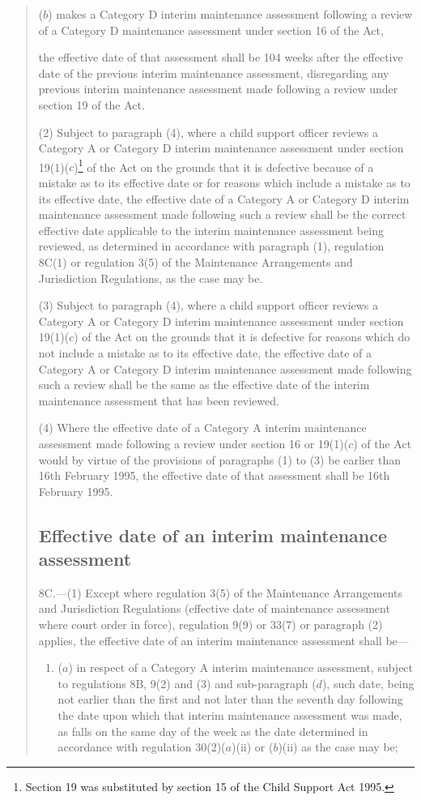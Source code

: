\documentclass[12pt,a4paper]{article}
\begin{document}
\begin{quotation}
\begin{enumerate}
($b$) makes a Category D interim maintenance assessment following a review of a Category D maintenance assessment under section 16 of the Act,
\end{enumerate}
the effective date of that assessment shall be 104 weeks after the effective date of the previous interim maintenance assessment, disregarding any previous interim maintenance assessment made following a review under section 19 of the Act.

(2) Subject to paragraph (4), where a child support officer reviews a Category A or Category D interim maintenance assessment under section 19(1)($c$)\footnote{\frenchspacing Section 19 was substituted by section 15 of the Child Support Act 1995.} of the Act on the grounds that it is defective because of a mistake as to its effective date or for reasons which include a mistake as to its effective date, the effective date of a Category A or Category D interim maintenance assessment made following such a review shall be the correct effective date applicable to the interim maintenance assessment being reviewed, as determined in accordance with paragraph (1), regulation 8C(1) or regulation 3(5) of the Maintenance Arrangements and Jurisdiction Regulations, as the case may be.

(3) Subject to paragraph (4), where a child support officer reviews a Category A or Category D interim maintenance assessment under section 19(1)($c$) of the Act on the grounds that it is defective for reasons which do not include a mistake as to its effective date, the effective date of a Category A or Category D interim maintenance assessment made following such a review shall be the same as the effective date of the interim maintenance assessment that has been reviewed.

(4) Where the effective date of a Category A interim maintenance assessment made following a review under section 16 or 19(1)($c$) of the Act would by virtue of the provisions of paragraphs (1) to (3) be earlier than 16th February 1995, the effective date of that assessment shall be 16th February 1995.

\subsection*{Effective date of an interim maintenance assessment}

8C.—(1) Except where regulation 3(5) of the Maintenance Arrangements and Jurisdiction Regulations (effective date of maintenance assessment where court order in force), regulation 9(9) or 33(7) or paragraph (2) applies, the effective date of an interim maintenance assessment shall be—
\begin{enumerate}\item[]
($a$) in respect of a Category A interim maintenance assessment, subject to regulations 8B, 9(2) and (3) and sub-paragraph ($d$), such date, being not earlier than the first and not later than the seventh day following the date upon which that interim maintenance assessment was made, as falls on the same day of the week as the date determined in accordance with regulation 30(2)($a$)(ii) or ($b$)(ii) as the case may be;


\end{enumerate}
\end{quotation}
\end{document}
